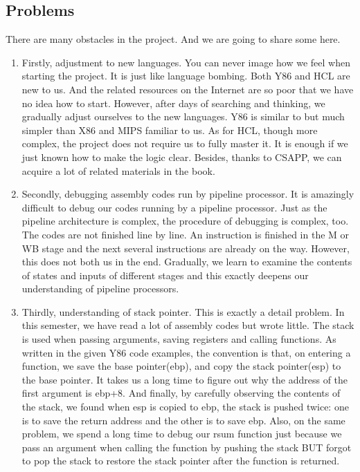 \documentclass{article}
\begin{document}
\subsection{Problems}
There are many obstacles in the project. And we are going to share some here. \\
\begin{enumerate}

  \item Firstly, adjustment to new languages. You can never image how we feel when starting the project. It is just like language bombing. Both Y86 and HCL are new to us. And the related resources on the Internet are so poor that we have no idea how to start. However, after days of searching and thinking, we gradually adjust ourselves to the new languages. Y86 is similar to but much simpler than X86 and MIPS familiar to us. As for HCL, though more complex, the project does not require us to fully master it. It is enough if we just known how to make the logic clear. Besides, thanks to CSAPP, we can acquire a lot of related materials in the book. 
  \item Secondly, debugging assembly codes run by pipeline processor. It is amazingly difficult to debug our codes running by a pipeline processor. Just as the pipeline architecture is complex, the procedure of debugging is complex, too. The codes are not finished line by line. An instruction is finished in the M or WB stage and the next several instructions are already on the way. However, this does not both us in the end. Gradually, we learn to examine the contents of states and inputs of different stages and this exactly deepens our understanding of pipeline processors.
  \item Thirdly, understanding of stack pointer. This is exactly a detail problem. In this semester, we have read a lot of assembly codes but wrote little. The stack is used when passing arguments, saving registers and calling functions. As written in the given Y86 code examples, the convention is that, on entering a function, we save the base pointer(ebp), and copy the stack pointer(esp) to the base pointer. It takes us a long time to figure out why the address of the first argument is ebp+8. And finally, by carefully observing the contents of the stack, we found when esp is copied to ebp, the stack is pushed twice: one is to save the return address and the other is to save ebp. Also, on the same problem, we spend a long time to debug our rsum function just because we pass an argument when calling the function by pushing the stack BUT forgot to pop the stack to restore the stack pointer after the function is returned. 
\end{enumerate}
\end{document}
